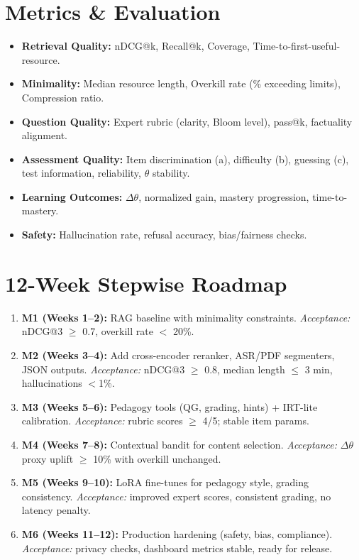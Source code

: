 \documentclass[12pt]{article}
\begin{document}
\section{Metrics \& Evaluation}
\begin{itemize}[leftmargin=1.2cm]
  \item \textbf{Retrieval Quality:} nDCG@k, Recall@k, Coverage, Time-to-first-useful-resource.
  \item \textbf{Minimality:} Median resource length, Overkill rate (\% exceeding limits), Compression ratio.
  \item \textbf{Question Quality:} Expert rubric (clarity, Bloom level), pass@k, factuality alignment.
  \item \textbf{Assessment Quality:} Item discrimination (a), difficulty (b), guessing (c), test information, reliability, $\theta$ stability.
  \item \textbf{Learning Outcomes:} $\Delta\theta$, normalized gain, mastery progression, time-to-mastery.
  \item \textbf{Safety:} Hallucination rate, refusal accuracy, bias/fairness checks.
\end{itemize}

\section{12-Week Stepwise Roadmap}
\begin{enumerate}[leftmargin=1.2cm]
  \item \textbf{M1 (Weeks 1–2):} RAG baseline with minimality constraints.  
    \emph{Acceptance:} nDCG@3 $\geq$ 0.7, overkill rate $<$ 20\%.
  \item \textbf{M2 (Weeks 3–4):} Add cross-encoder reranker, ASR/PDF segmenters, JSON outputs.  
    \emph{Acceptance:} nDCG@3 $\geq$ 0.8, median length $\leq$ 3 min, hallucinations $<$1\%.
  \item \textbf{M3 (Weeks 5–6):} Pedagogy tools (QG, grading, hints) + IRT-lite calibration.  
    \emph{Acceptance:} rubric scores $\geq$ 4/5; stable item params.
  \item \textbf{M4 (Weeks 7–8):} Contextual bandit for content selection.  
    \emph{Acceptance:} $\Delta\theta$ proxy uplift $\geq$ 10\% with overkill unchanged.
  \item \textbf{M5 (Weeks 9–10):} LoRA fine-tunes for pedagogy style, grading consistency.  
    \emph{Acceptance:} improved expert scores, consistent grading, no latency penalty.
  \item \textbf{M6 (Weeks 11–12):} Production hardening (safety, bias, compliance).  
    \emph{Acceptance:} privacy checks, dashboard metrics stable, ready for release.
\end{enumerate}
\end{document}
